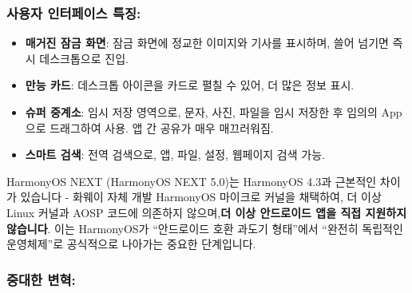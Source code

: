 \subsubsection*{사용자 인터페이스 특징:}

\begin{itemize}
  \item \textbf{매거진 잠금 화면}: 잠금 화면에 정교한 이미지와 기사를 표시하며, 쓸어 넘기면 즉시 데스크톱으로 진입.
  \item \textbf{만능 카드}: 데스크톱 아이콘을 카드로 펼칠 수 있어, 더 많은 정보 표시.
  \item \textbf{슈퍼 중계소}: 임시 저장 영역으로, 문자, 사진, 파일을 임시 저장한 후 임의의 App으로 드래그하여 사용. 앱 간 공유가 매우 매끄러워짐.
  \item \textbf{스마트 검색}: 전역 검색으로, 앱, 파일, 설정, 웹페이지 검색 가능.
\end{itemize}


HarmonyOS NEXT (HarmonyOS NEXT 5.0)는 HarmonyOS 4.3과 근본적인 차이가 있습니다 - 화웨이 자체 개발 HarmonyOS 마이크로 커널을 채택하여, 더 이상 Linux 커널과 AOSP 코드에 의존하지 않으며,\textbf{더 이상 안드로이드 앱을 직접 지원하지 않습니다}. 이는 HarmonyOS가 “안드로이드 호환 과도기 형태”에서 “완전히 독립적인 운영체제”로 공식적으로 나아가는 중요한 단계입니다.

\subsubsection*{중대한 변혁:}

